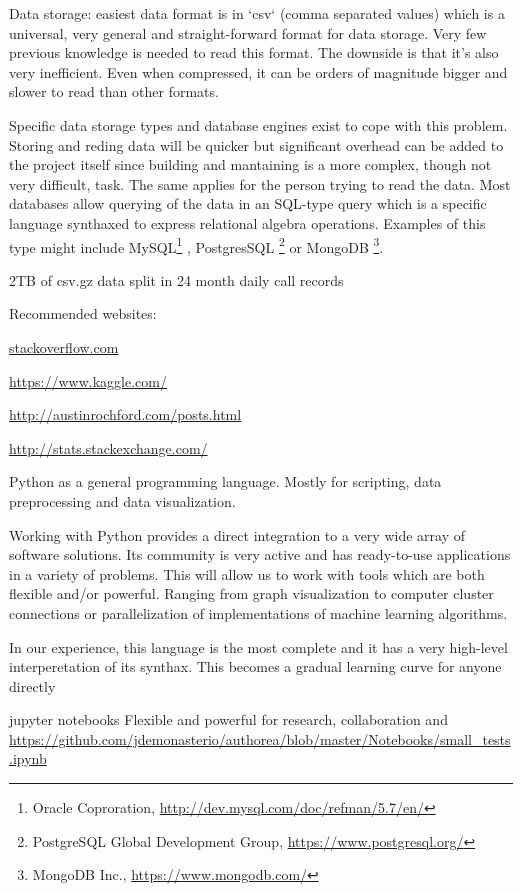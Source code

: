 \documentclass{article}%
\theoremstyle{definition}
\begin{document}
Data storage: easiest data format is in `csv` (comma separated values) which is a universal, very general and straight-forward format for data storage. Very few previous knowledge is needed to read this format. The downside is that it's also very inefficient. Even when compressed, it can be orders of magnitude bigger and slower to read than other formats.

Specific data storage types and database engines exist to cope with this problem. Storing and reding data will be quicker but significant overhead can be added to the project itself since building and mantaining is a more complex, though not very difficult, task. The same applies for the person trying to read the data. Most databases allow querying of the data in an SQL-type query which is a specific language synthaxed to express relational algebra operations. Examples of this type might include MySQL\footnote{ Oracle Coproration, \url{http://dev.mysql.com/doc/refman/5.7/en/}} , PostgresSQL \footnote{ PostgreSQL Global Development Group, \url{https://www.postgresql.org/}} or MongoDB \footnote{ MongoDB Inc., \url{https://www.mongodb.com/}}.

2TB of csv.gz data split in 24 month daily call records

Recommended websites:

\url{stackoverflow.com}

\url{https://www.kaggle.com/} 

\url{http://austinrochford.com/posts.html}

\url{http://stats.stackexchange.com/}

Python as a general programming language. Mostly for scripting, data preprocessing and data visualization. 

Working with Python provides a direct integration to a very wide array of software solutions. Its community is very active and has ready-to-use applications in a variety of problems. This will allow us to work with tools which are both flexible and/or powerful. Ranging from graph visualization to computer cluster connections or parallelization of implementations of machine learning algorithms.

In our experience, this language is the most complete and it has a very high-level interperetation of its synthax. This becomes a gradual learning curve for anyone directly

jupyter notebooks
Flexible and powerful for research, collaboration and 
\url{https://github.com/jdemonasterio/authorea/blob/master/Notebooks/small_tests.ipynb}
\end{document}
